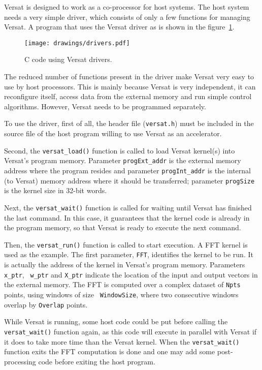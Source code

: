 Versat is designed to work as a co-processor for host systems. The
host system needs a very simple driver, which consists of only a few
functions for managing Versat. A program that uses the Versat driver
as is shown in the figure~\ref{fig_drivers}.

\begin{figure}[!htb]
\centering \texttt{[image: drawings/drivers.pdf]}
\caption{C code using Versat drivers.}
\label{fig_drivers}
\end{figure}

The reduced number of functions present in the driver make Versat very
easy to use by host processors. This is mainly because Versat is very
independent, it can reconfigure itself, access data from the external
memory and run simple control algorithms. However, Versat needs to be
programmed separately.

To use the driver, first of all, the header file ({\tt versat.h}) must
be included in the source file of the host program willing to use
Versat as an accelerator.

Second, the {\tt versat\_load()} function is called to load Versat
kernel(s) into Versat's program memory. Parameter {\tt progExt\_addr}
is the external memory address where the program resides and parameter
{\tt progInt\_addr} is the internal (to Versat) memory address where
it should be transferred; parameter {\tt progSize} is the kernel size
in 32-bit words.

Next, the {\tt versat\_wait()} function is called for waiting until
Versat has finished the last command. In this case, it guarantees that
the kernel code is already in the program memory, so that Versat is ready
to execute the next command.

Then, the {\tt versat\_run()} function is called to start execution. A
FFT kernel is used as the example. The first parameter, {\tt FFT},
identifies the kernel to be run. It is actually the address of the
kernel in Versat's program memory. Parameters {\tt x\_ptr}, {\tt
  w\_ptr} and {\tt X\_ptr} indicate the location of the input and
output vectors in the external memory. The FFT is computed over a
complex dataset of {\tt Npts} points, using windows of size {\tt
  WindowSize}, where two consecutive windows overlap by {\tt Overlap}
points.

While Versat is running, some host code could be put before calling
the {\tt versat\_wait()} function again, as this code will execute in
parallel with Versat if it does to take more time than the Versat
kernel. When the {\tt versat\_wait()} function exits the FFT
computation is done and one may add some post-processing code before
exiting the host program.


